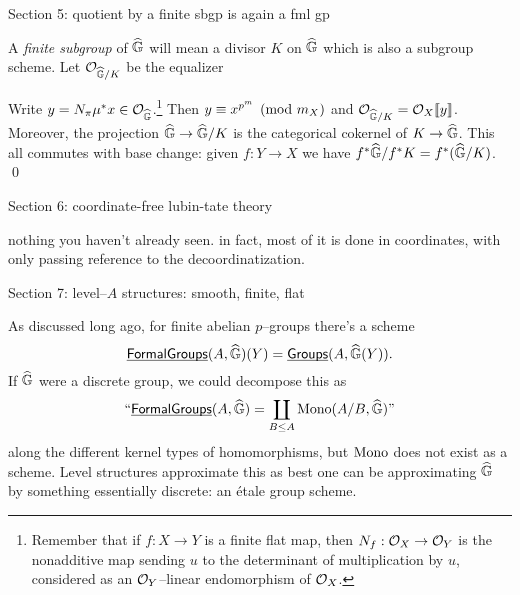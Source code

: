 Section 5: quotient by a finite sbgp is again a fml gp

\begin{definition}
A \textit{finite subgroup} of $\widehat{\mathbb G}$ will mean a divisor $K$ on $\widehat{\mathbb G}$ which is also a subgroup scheme.  Let $\mathcal{O}_{\widehat{\mathbb G}/K}$ be the equalizer
\begin{center}
\end{center}
\end{definition}

\begin{lemma}
Write $y = N_\pi \mu^* x \in \mathcal{O}_{\widehat{\mathbb G}}$.\footnote{Remember that if $f: X \to Y$ is a finite flat map, then $N_f: \mathcal{O}_X \to \mathcal{O}_Y$ is the nonadditive map sending $u$ to the determinant of multiplication by $u$, considered as an $\mathcal{O}_Y$--linear endomorphism of $\mathcal{O}_X$.}  Then $y \equiv x^{p^m} \pmod{m_X}$ and $\mathcal{O}_{\widehat{\mathbb G}/K} = \mathcal{O}_X\llbracket{y}\rrbracket$.  Moreover, the projection $\widehat{\mathbb G} \to \widehat{\mathbb G}/K$ is the categorical cokernel of $K \to \widehat{\mathbb G}$.  This all commutes with base change: given $f: Y \to X$ we have $f^* \widehat{\mathbb G} / f^* K = f^*(\widehat{\mathbb G}/K)$. \qed {}
\end{lemma}


Section 6: coordinate-free lubin-tate theory

nothing you haven't already seen. in fact, most of it is done in coordinates, with only passing reference to the decoordinatization.

Section 7: level--$A$ structures: smooth, finite, flat

As discussed long ago, for finite abelian $p$--groups there's a scheme \[\operatorname{\underline{\smash{\mathsf{FormalGroups}}}}(A, \widehat{\mathbb G})(Y) = \operatorname{\underline{\smash{\mathsf{Groups}}}}(A, \widehat{\mathbb G}(Y)).\]  If $\widehat{\mathbb G}$ were a discrete group, we could decompose this as \[\text{``$\operatorname{\underline{\smash{\mathsf{FormalGroups}}}}(A, \widehat{\mathbb G}) = \coprod_{B \le A} \operatorname{Mono}(A/B, \widehat{\mathbb G})$''}\] along the different kernel types of homomorphisms, but $\operatorname{Mono}$ does not exist as a scheme.  Level structures approximate this as best one can be approximating $\widehat{\mathbb G}$ by something essentially discrete: an \'etale group scheme.

